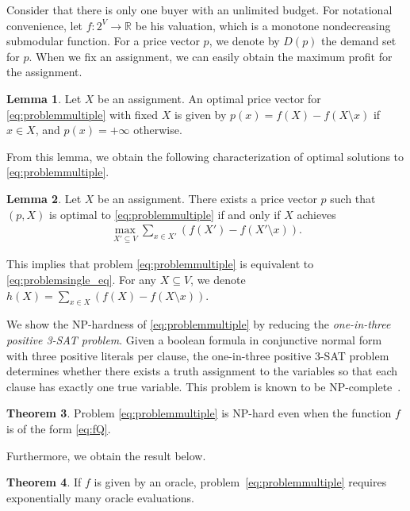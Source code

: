 \documentclass[letterpaper]{article}
\theoremstyle{definition}
\newtheorem{theorem}{Theorem}
\newtheorem{lemma}[theorem]{Lemma}
\newcommand{\COMM}[2]{{
\begin{CJK}{UTF8}{ipxm}
\ifthenelse{\equal{#1}{TM}}{\color{blue}}{
\ifthenelse{\equal{#1}{YK}}{\color{red}}{
\ifthenelse{\equal{#1}{HS}}{\color{cyan}}{
\ifthenelse{\equal{#1}{KK}}{\color{magenta}}}}}
[#1: #2]
\end{CJK}
}}
\begin{document}
Consider that there is only one buyer with an unlimited budget. 
For notational convenience, let $f: 2^V \to \mathbb{R}$ be his valuation, which is a monotone nondecreasing submodular function. 
For a price vector $p$, we denote by $D(p)$ the demand set for $p$.  
When we fix an assignment, we can easily obtain the maximum profit for the assignment. 
\begin{lemma}\label{lem:single_obs}
Let $X$ be an assignment. 
An optimal price vector for \eqref{eq:problemmultiple} with fixed $X$ is given by 
$p(x) = f(X)-f(X \setminus x)$ if $x \in X$, and $p(x)=+\infty$ otherwise. 
\end{lemma}
From this lemma, we obtain the following characterization of optimal solutions to \eqref{eq:problemmultiple}. 
\begin{lemma}\label{lem:Dtoh}
Let $X$ be an assignment. 
There exists a price vector $p$ such that $(p, X)$ is optimal to  \eqref{eq:problemmultiple} if and only if $X$ achieves
\begin{align}\label{eq:problemsingle_eq}
\textstyle
  \max_{X' \subseteq V} \sum_{x \in X'} (f(X') - f(X' \setminus x)). 
\end{align}
\end{lemma}
This implies that problem \eqref{eq:problemmultiple} is equivalent to \eqref{eq:problemsingle_eq}. 
For any $X \subseteq V$, we denote \(h(X) = \sum_{x \in X} (f(X) - f(X \setminus x))\).

We show the NP-hardness of \eqref{eq:problemmultiple} by reducing the \emph{one-in-three positive 3-SAT problem}. 
Given a boolean formula in conjunctive normal form with three positive literals per clause, the one-in-three positive 3-SAT problem determines whether there exists a truth assignment to the variables so that each clause has exactly one true variable. 
This problem is known to be NP-complete~\cite{schaefer1978complexity}.

\begin{theorem}
\label{thm:NPhard}
Problem \eqref{eq:problemmultiple} is NP-hard even when the function $f$ is of the form \eqref{eq:fQ}.
\end{theorem}


Furthermore, we obtain the result below.
\begin{theorem}
\label{thm:exporacle}
If $f$ is given by an oracle, problem~\eqref{eq:problemmultiple} requires exponentially many oracle evaluations.
\end{theorem}
\end{document}

